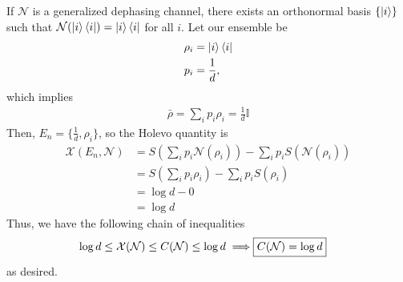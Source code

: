 \documentclass[10pt,oneside,longbibliography]{report}
\begin{document}
If $\mathcal{N}$ is a generalized dephasing channel, there exists an orthonormal basis $\{\ket{i}\}$ such that $\mathcal{N}(\ket{i}\bra{i})=\ket{i}\bra{i}$ for all $i$. Let our ensemble be 
\begin{align}
    \rho_i &= \ket{i}\bra{i} \\
    p_i &= \frac{1}{d}, 
\end{align}
which implies
\begin{align}
    \bar{\rho} = \sum_i p_i \rho_i = \frac{1}{d} \mathbb{I}
\end{align}
Then, $E_n = \{\frac{1}{d}, \rho_i \}$, so the Holevo quantity is 
\begin{align}
    \mathcal{X} (E_n, \mathcal{N}) &= S(\sum_i p_i \mathcal{N}(\rho_i))-\sum_i p_i S(\mathcal{N}(\rho_i)) \\
    &= S(\sum_i p_i \rho_i) - \sum_i p_i S(\rho_i)\\
    &=\log{d}-0 \\
    &= \log{d}
\end{align}
Thus, we have the following chain of inequalities 
\begin{align}
    \log{d} \leq \mathcal{X}(\mathcal{N}) \leq C(\mathcal{N}) \leq \log{d} \implies \Aboxed{C(\mathcal{N}) = \log{d}}
\end{align}
as desired.
\end{document}
